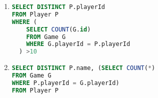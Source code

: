 \begin{enumerate}
  \item
        \begin{minipage}[t]{0.5\textwidth}
          \begin{lstlisting}[language=sql]
SELECT DISTINCT P.playerId
FROM Player P
WHERE (
    SELECT COUNT(G.id)
    FROM Game G
    WHERE G.playerId = P.playerId
  ) >10
\end{lstlisting}

        \end{minipage}

  \item

        \begin{minipage}[t]{0.5\textwidth}
          \begin{lstlisting}[language=sql]
SELECT DISTINCT P.name, (SELECT COUNT(*)
FROM Game G
WHERE P.playerId = G.playerId)
FROM Player P
\end{lstlisting}

        \end{minipage}
\end{enumerate}


